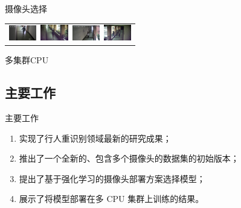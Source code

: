 \begin{frame}{摄像头选择}
\begin{table}
\begin{tabular}{c}
        \includegraphics[width=12mm]{figures/3-4}~\includegraphics[width=12mm]{figures/3-5}~\includegraphics[width=12mm]{figures/3-6}~\includegraphics[width=12mm]{figures/3-7} \\
    \end{tabular}
\end{table}
\end{frame}


\begin{frame}{多集群CPU}
\end{frame}

\subsection{主要工作}

\begin{frame}{主要工作}
\begin{block}{}
    \begin{enumerate}
        \item 实现了行人重识别领域最新的研究成果；\\[1em]
        \item 推出了一个全新的、包含多个摄像头的数据集的初始版本；\\[1em]
        \item 提出了基于强化学习的摄像头部署方案选择模型；\\[1em]
        \item 展示了将模型部署在多 CPU 集群上训练的结果。
    \end{enumerate}
\end{block}
\end{frame}
